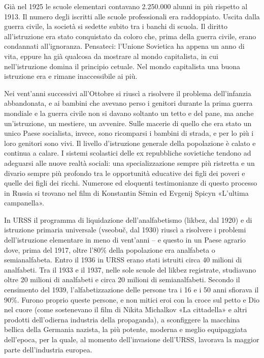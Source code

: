 \documentclass[../main]{subfiles}
\begin{document}
Già nel 1925 le scuole elementari contavano 2.250.000 alunni in più rispetto al 1913. Il numero degli iscritti alle scuole professionali era raddoppiato. Uscita dalla guerra civile, la società si sedette subito tra i banchi di scuola. Il diritto all'istruzione era stato conquistato da coloro che, prima della guerra civile, erano condannati all'ignoranza. Pensateci: l'Unione Sovietica ha appena un anno di vita, eppure ha già qualcosa da mostrare al mondo capitalista, in cui nell'istruzione domina il principio cetuale. Nel mondo capitalista una buona istruzione era e rimane inaccessibile ai più.

Nei vent'anni successivi all'Ottobre si riuscì a risolvere il problema dell'infanzia abbandonata, e ai bambini che avevano perso i genitori durante la prima guerra mondiale e la guerra civile non si davano soltanto un tetto e del pane, ma anche un'istruzione, un mestiere, un avvenire. Sulle macerie di quello che era stato un unico Paese socialista, invece, sono ricomparsi i bambini di strada, e per lo più i loro genitori sono vivi. Il livello d'istruzione generale della popolazione è calato e continua a calare. I sistemi scolastici delle ex repubbliche sovietiche tendono ad adeguarsi alle nuove realtà sociali: una specializzazione sempre più ristretta e un divario sempre più profondo tra le opportunità educative dei figli dei poveri e quelle dei figli dei ricchi. Numerose ed eloquenti testimonianze di questo processo in Russia si trovano nel film di Konstantin Sëmin ed Evgenij Spicyn «L'ultima campanella».

In URSS il programma di liquidazione dell'analfabetismo (likbez, dal 1920) e di istruzione primaria universale (vseobuč, dal 1930) riuscì a risolvere i problemi dell'istruzione elementare in meno di vent'anni – e questo in un Paese agrario dove, prima del 1917, oltre l'80\% della popolazione era analfabeta o semianalfabeta. Entro il 1936 in URSS erano stati istruiti circa 40 milioni di analfabeti. Tra il 1933 e il 1937, nelle sole scuole del likbez registrate, studiavano oltre 20 milioni di analfabeti e circa 20 milioni di semianalfabeti. Secondo il censimento del 1939, l'alfabetizzazione delle persone tra i 16 e i 50 anni sfiorava il 90\%. Furono proprio queste persone, e non mitici eroi con la croce sul petto e Dio nel cuore (come sostenevano il film di Nikita Michalkov «La cittadella» e altri prodotti dell'odierna industria della propaganda), a sconfiggere la macchina bellica della Germania nazista, la più potente, moderna e meglio equipaggiata dell'epoca, per la quale, al momento dell'invasione dell'URSS, lavorava la maggior parte dell'industria europea.
\end{document}
